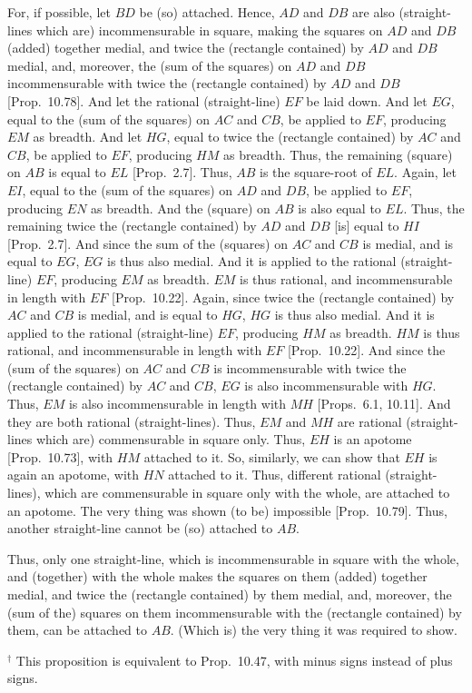 \begin{Parallel}{}{}
{For, if possible, let $BD$ be (so) attached. Hence, $AD$ and
$DB$ are also (straight-lines which are) incommensurable in square, making the
squares on $AD$ and $DB$ (added) together medial, and twice the (rectangle contained) by $AD$ and $DB$ medial, and, moreover, the (sum of the squares)
on $AD$ and $DB$ incommensurable with twice the (rectangle contained)
by $AD$ and $DB$ [Prop.~10.78].
And let the rational (straight-line) $EF$ be laid down. And let $EG$, equal
to the (sum of the squares) on $AC$ and $CB$, be applied to
$EF$, producing $EM$ as breadth. And let $HG$, equal to twice the (rectangle contained) by $AC$ and $CB$, be applied to $EF$, producing $HM$ as breadth. Thus, the remaining (square) on  $AB$ is equal
to $EL$ [Prop.~2.7].  Thus, $AB$ is the square-root
of $EL$. Again, let $EI$, equal to the (sum of the squares) on $AD$ and $DB$, be applied to $EF$, producing $EN$ as breadth. And the (square) on $AB$
 is also equal to $EL$. Thus, the remaining twice the
(rectangle contained) by $AD$ and $DB$ [is] equal to $HI$ [Prop.~2.7].  And since the sum of the (squares) on $AC$ and $CB$ is medial, and is equal to $EG$, $EG$ is thus also medial.
And it is applied to the rational (straight-line) $EF$, producing $EM$ as breadth. $EM$ is thus rational, and incommensurable in length with $EF$
[Prop.~10.22]. Again, since twice the
(rectangle contained) by $AC$ and $CB$ is medial, and is equal to $HG$,
$HG$ is thus also medial. And it is applied to the rational (straight-line) $EF$,
producing $HM$ as breadth. $HM$ is thus rational, and incommensurable in
length with $EF$ [Prop.~10.22]. 
And since the (sum of the squares) on
 $AC$ and $CB$ is incommensurable
with twice the (rectangle contained) by $AC$ and $CB$, $EG$ is also incommensurable with $HG$. Thus, $EM$ is also incommensurable in length
with $MH $ [Props.~6.1, 10.11]. And they are both  rational (straight-lines). Thus, $EM$ and $MH $ are rational (straight-lines which are) commensurable in square
only. Thus, $EH$ is an apotome [Prop.~10.73], with $HM$ attached to it. So, similarly, we can show that $EH$ is again an apotome, with $HN$ attached to it. Thus, different rational (straight-lines),
which are commensurable in square only with the whole, are attached to
an apotome. The very thing was shown (to be) impossible [Prop.~10.79]. Thus, another straight-line cannot
be (so) attached to $AB$.

Thus, only one straight-line, which is incommensurable
in square with the whole, and (together) with the whole makes the 
squares on them (added) together medial, and twice the (rectangle contained) by
them medial, and, moreover, the (sum of the)
squares on them incommensurable with the (rectangle contained)
by them, can be attached to $AB$. (Which is) the very thing it
was required to show.}
\end{Parallel}
{\footnotesize\noindent$^\dag$ This proposition is equivalent to 
Prop.~10.47, with minus signs instead of
plus signs.}

